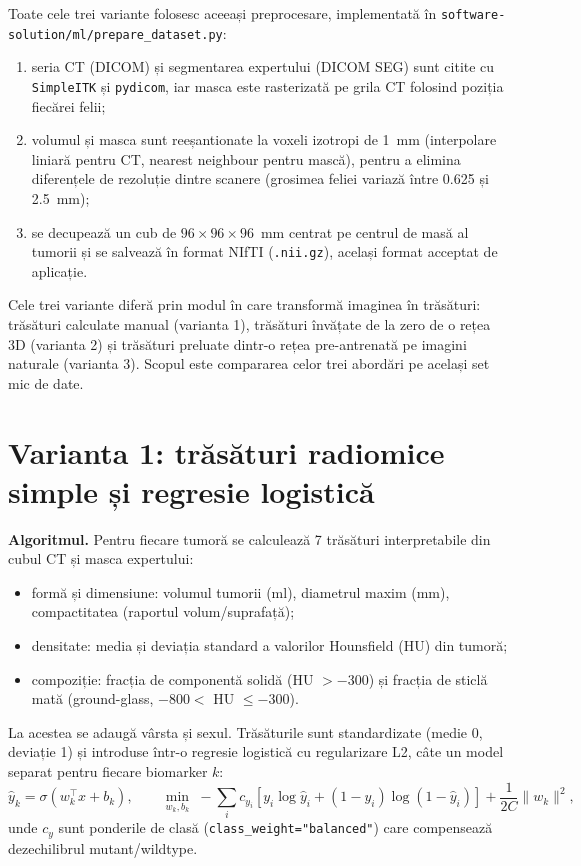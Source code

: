 \documentclass[runningheads,a4paper,11pt]{report}
\begin{document}
Toate cele trei variante folosesc aceeași preprocesare, implementată în \nolinkurl{software-solution/ml/prepare_dataset.py}:
\begin{enumerate}
    \item seria CT (DICOM) și segmentarea expertului (DICOM SEG) sunt citite cu \texttt{SimpleITK} și \texttt{pydicom}, iar masca este rasterizată pe grila CT folosind poziția fiecărei felii;
    \item volumul și masca sunt reeșantionate la voxeli izotropi de 1~mm (interpolare liniară pentru CT, nearest neighbour pentru mască), pentru a elimina diferențele de rezoluție dintre scanere (grosimea feliei variază între 0.625 și 2.5~mm);
    \item se decupează un cub de $96 \times 96 \times 96$~mm centrat pe centrul de masă al tumorii și se salvează în format NIfTI (\texttt{.nii.gz}), același format acceptat de aplicație.
\end{enumerate}

Cele trei variante diferă prin modul în care transformă imaginea în trăsături: trăsături calculate manual (varianta 1), trăsături învățate de la zero de o rețea 3D (varianta 2) și trăsături preluate dintr-o rețea pre-antrenată pe imagini naturale (varianta 3). Scopul este compararea celor trei abordări pe același set mic de date.

\section{Varianta 1: trăsături radiomice simple și regresie logistică}
\textbf{Algoritmul.} Pentru fiecare tumoră se calculează 7 trăsături interpretabile din cubul CT și masca expertului:
\begin{itemize}
    \item formă și dimensiune: volumul tumorii (ml), diametrul maxim (mm), compactitatea (raportul volum/suprafață);
    \item densitate: media și deviația standard a valorilor Hounsfield (HU) din tumoră;
    \item compoziție: fracția de componentă solidă (HU $> -300$) și fracția de sticlă mată (ground-glass, $-800 <$ HU $\le -300$).
\end{itemize}
La acestea se adaugă vârsta și sexul. Trăsăturile sunt standardizate (medie 0, deviație 1) și introduse într-o regresie logistică cu regularizare L2, câte un model separat pentru fiecare biomarker $k$:
\[
\hat{y}_k = \sigma\left(w_k^\top x + b_k\right), \qquad \min_{w_k, b_k} \; -\sum_i c_{y_i}\left[y_i \log \hat{y}_i + (1-y_i)\log(1-\hat{y}_i)\right] + \frac{1}{2C}\lVert w_k \rVert^2,
\]
unde $c_{y}$ sunt ponderile de clasă (\texttt{class\_weight="balanced"}) care compensează dezechilibrul mutant/wildtype.
\end{document}
